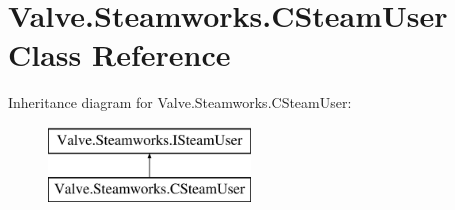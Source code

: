 \hypertarget{classValve_1_1Steamworks_1_1CSteamUser}{}\section{Valve.\+Steamworks.\+C\+Steam\+User Class Reference}
\label{classValve_1_1Steamworks_1_1CSteamUser}
Inheritance diagram for Valve.\+Steamworks.\+C\+Steam\+User\+:\begin{figure}[H]
\begin{center}
\leavevmode
\includegraphics[height=2.000000cm]{classValve_1_1Steamworks_1_1CSteamUser}
\end{center}
\end{figure}
